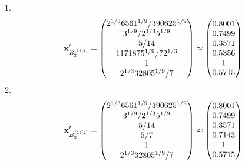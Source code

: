 \documentclass[10pt,a4paper]{article}
\begin{document}
	1.
	\[
		\bold{x}'_{B_2^{(1)[2]}} = 
		\begin{pmatrix}
			{{2^ {1 / 3}}{6561^ {1 / 9}}} / {{390625^ {1 / 9}}} \\
			{{3^ {1 / 9}}} / {{2^ {1 / 3}}{5^ {1 / 9}}} \\
			{{5}} / {{14}} \\
			{{1171875^ {1 / 9}}} / {{7}{2^ {1 / 3}}} \\
			{1}{} \\
			{{2^ {1 / 3}}{32805^ {1 / 9}}} / {{7}} \\
		\end{pmatrix}
		\approx
		\begin{pmatrix}
			0.8001   \\
			0.7499   \\
			0.3571   \\
			0.5356   \\
			1        \\
			0.5715   \\
		\end{pmatrix}
	\]
	2.
	\[
		\bold{x}'_{B_2^{(1)[2]}} = 
		\begin{pmatrix}
			{{2^ {1 / 3}}{6561^ {1 / 9}}} / {{390625^ {1 / 9}}} \\
			{{3^ {1 / 9}}} / {{2^ {1 / 3}}{5^ {1 / 9}}} \\
			{{5}} / {{14}} \\
			{{5}} / {{7}} \\
			{1}{} \\
			{{2^ {1 / 3}}{32805^ {1 / 9}}} / {{7}} \\
		\end{pmatrix}
		\approx
		\begin{pmatrix}
			0.8001   \\
			0.7499   \\
			0.3571   \\
			0.7143   \\
			1        \\
			0.5715   \\
		\end{pmatrix}
	\]
\end{document}
